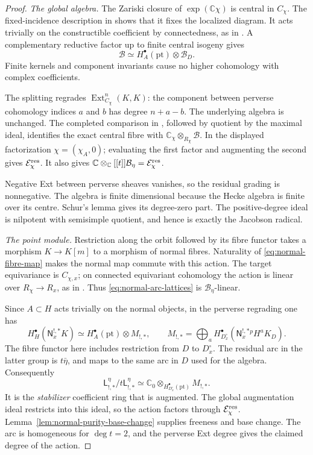 \documentclass[11pt]{amsart}
\theoremstyle{definition}
\theoremstyle{remark}
\newcommand{\C}{\mathbb C}
\newcommand{\A}{\C[[t]]}
\newcommand{\Ext}{\operatorname{Ext}}
\begin{document}
\begin{proof}
\emph{The global algebra.}
The Zariski closure of $\exp(\mathbb C\chi)$ is central in $C_\chi$.
The fixed-incidence description in \cite[Section~2.1]{Solleveld} shows
that it fixes the localized diagram.  It acts trivially on the
constructible coefficient by connectedness, as in
\cite[Lemma~2.7, equations~(2.23)--(2.24)]{Solleveld}.
A complementary reductive factor up to finite central isogeny gives
\[
 \mathcal B\simeq H_A^\bullet(\mathrm{pt})\otimes\mathcal B_D.
\]
Finite kernels and component invariants cause no higher cohomology
with complex coefficients.

The splitting regrades $\Ext^n_{C_\chi}(K,K)$: the component between
perverse cohomology indices $a$ and $b$ has degree $n+a-b$.
The underlying algebra is unchanged.
The completed comparison in
\cite[Proposition~2.3 and Theorem~2.5]{Solleveld}, followed by quotient
by the maximal ideal, identifies the exact central fibre with
$\mathbb C_\chi\otimes_{R_\chi}\mathcal B$.  In the displayed
factorization $\chi=(\chi_A,0)$; evaluating the first factor and
augmenting the second gives $\mathcal E_\chi^{\rm res}$.  It also gives
$\mathbb C\otimes_\A\mathcal B_\eta=\mathcal E_\chi^{\rm res}$.

Negative Ext between perverse sheaves vanishes, so the residual grading
is nonnegative.  The algebra is finite dimensional because the Hecke
algebra is finite over its centre.  Schur's lemma gives its degree-zero
part.  The positive-degree ideal is nilpotent with semisimple quotient,
and hence is exactly the Jacobson radical.

\smallskip
\emph{The point module.}
Restriction along the orbit followed by its fibre functor takes a
morphism $K\to K[m]$ to a morphism of normal fibres.  Naturality of
\eqref{eq:normal-fibre-map} makes the normal map commute with this
action.  The target equivariance is $C_{\chi,x}$; on connected
equivariant cohomology the action is linear over $R_\chi\to R_x$, as in
\cite[equations~(3.15)--(3.16)]{Solleveld}.  Thus
\eqref{eq:normal-arc-lattices} is $\mathcal B_\eta$-linear.

Since $A\subset H$ acts trivially on the normal objects, in the
perverse regrading one has
\[
 H_H^\bullet(\mathsf N_x^{!,*}K)
 \simeq H_A^\bullet(\mathrm{pt})\otimes M_{!,*},\qquad
 M_{!,*}=\bigoplus_a
 H_{D_x^\circ}^\bullet(\mathsf N_x^{!,*}{}^pH^aK_D).
\]
The fibre functor here includes restriction from $D$ to $D_x^\circ$.
The residual arc in the latter group is $t\bar\eta$, and maps to the
same arc in $D$ used for the algebra.  Consequently
\[
 \mathsf L_{!,*}^\eta/t\mathsf L_{!,*}^\eta
 \simeq\mathbb C_0\otimes_{H_{D_x^\circ}^\bullet(\mathrm{pt})}M_{!,*}.
\]
It is the \emph{stabilizer} coefficient ring that is augmented.
The global augmentation ideal restricts into this ideal, so the
action factors through $\mathcal E_\chi^{\rm res}$.
Lemma~\ref{lem:normal-purity-base-change} supplies freeness and base
change.  The arc is homogeneous for $\deg t=2$, and the perverse Ext
degree gives the claimed degree of the action.


\end{proof}
\end{document}

